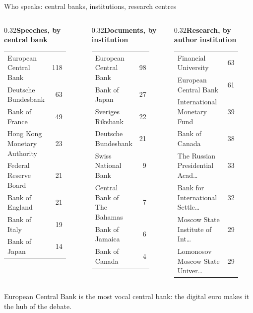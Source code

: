 \documentclass[aspectratio=169,10pt]{beamer}
\begin{document}
\begin{frame}{Who speaks: central banks, institutions, research centres}
\begin{columns}[T]\begin{column}{0.32\textwidth}\scriptsize\textbf{Speeches, by central bank}\\[2pt]\begin{tabular}{@{}p{0.8\linewidth}r@{}}European Central Bank & 118 \\
Deutsche Bundesbank & 63 \\
Bank of France & 49 \\
Hong Kong Monetary Authority & 23 \\
Federal Reserve Board & 21 \\
Bank of England & 21 \\
Bank of Italy & 19 \\
Bank of Japan & 14 \\\end{tabular}\end{column}\begin{column}{0.32\textwidth}\scriptsize\textbf{Documents, by institution}\\[2pt]\begin{tabular}{@{}p{0.8\linewidth}r@{}}European Central Bank & 98 \\
Bank of Japan & 27 \\
Sveriges Riksbank & 22 \\
Deutsche Bundesbank & 21 \\
Swiss National Bank & 9 \\
Central Bank of The Bahamas & 7 \\
Bank of Jamaica & 6 \\
Bank of Canada & 4 \\\end{tabular}\end{column}\begin{column}{0.32\textwidth}\scriptsize\textbf{Research, by author institution}\\[2pt]\begin{tabular}{@{}p{0.8\linewidth}r@{}}Financial University & 63 \\
European Central Bank & 61 \\
International Monetary Fund & 39 \\
Bank of Canada & 38 \\
The Russian Presidential Acad\dots{} & 33 \\
Bank for International Settle\dots{} & 32 \\
Moscow State Institute of Int\dots{} & 29 \\
Lomonosov Moscow State Univer\dots{} & 29 \\\end{tabular}\end{column}\end{columns}
\vspace{3pt}
\small \alert{European Central Bank} is the most vocal central bank: the digital euro makes it the hub of the debate.
\end{frame}
\end{document}
